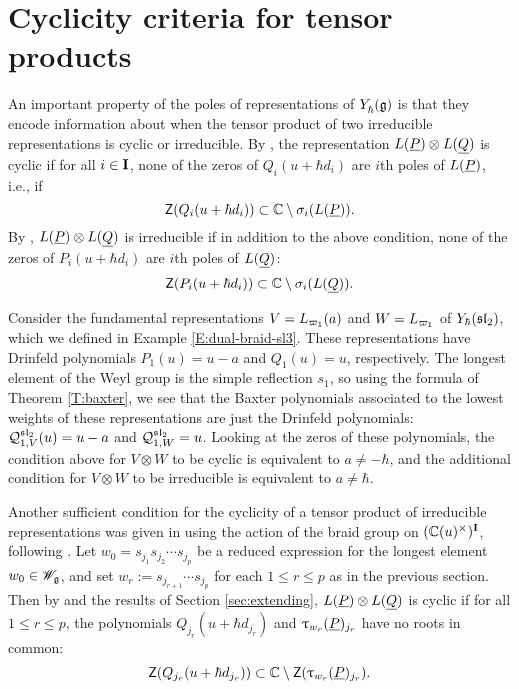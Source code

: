 \section{Cyclicity criteria for tensor products}

An important property of the poles of representations of $Y_\hbar^{}(\mathfrak{g})$ is that they encode information about when the tensor product of two irreducible representations is cyclic or irreducible.
By \cite[Thm. 7.2]{gautam_poles_2023}, the representation $L(\underline{P})\otimes L(\underline{Q})$ is cyclic if for all $i\in\mathbf{I}$, none of the zeros of $Q_i(u+\hbar d_i)$ are $i$th poles of $L(\underline{P})$, i.e., if
\[\mathsf{Z}(Q_i(u+\hbar d_i)) \subset \mathbb{C}\setminus\sigma_i(L(\underline{P})).\]
By \cite[Cor. 7.3]{gautam_poles_2023}, $L(\underline{P})\otimes L(\underline{Q})$ is irreducible if in addition to the above condition, none of the zeros of $P_i(u+\hbar d_i)$ are $i$th poles of $L(\underline{Q})$:
\[\mathsf{Z}(P_i(u+\hbar d_i)) \subset \mathbb{C}\setminus\sigma_i(L(\underline{Q})).\]

\begin{example}\label{E:cyclicity}
    Consider the fundamental representations $V = L_{\varpi_1}(a)$ and $W = L_{\varpi_1}$ of $Y_\hbar(\mathfrak{sl}_2)$, which we defined in Example \ref{E:dual-braid-sl3}.
    These representations have Drinfeld polynomials $P_1(u) = u-a$ and $Q_1(u) = u$, respectively.
    The longest element of the Weyl group is the simple reflection $s_1$, so using the formula of Theorem \ref{T:baxter}, we see that the Baxter polynomials associated to the lowest weights of these representations are just the Drinfeld polynomials: $\mathcal{Q}_{1,V}^{\mathfrak{sl}_2}(u) = u-a$ and $\mathcal{Q}_{1,W}^{\mathfrak{sl}_2} = u$.
    Looking at the zeros of these polynomials, the condition above for $V\otimes W$ to be cyclic is equivalent to $a\neq -\hbar$, and the additional condition for $V\otimes W$ to be irreducible is equivalent to $a\neq\hbar$.
\end{example}

Another sufficient condition for the cyclicity of a tensor product of irreducible representations was given in \cite[Thm. 4.8]{tan_braid_2015} using the action of the braid group on $(\mathbb{C}(u)^\times)^{\mathbf{I}}$, following \cite{chari_braid_2002}.
Let $w_0 = s_{j_1}s_{j_2}\cdots s_{j_p}$ be a reduced expression for the longest element $w_0\in\mathscr{W}_{\mathfrak{g}}$, and set $w_r := s_{j_{r+1}}\cdots s_{j_p}$ for each $1\leq r\leq p$ as in the previous section.
Then by \cite[Thm. 4.8]{tan_braid_2015} and the results of Section \ref{sec:extending}, $L(\underline{P})\otimes L(\underline{Q})$ is cyclic if for all $1\leq r\leq p$, the polynomials $Q_{j_r}(u+\hbar d_{j_r})$ and $\uptau_{w_r}(\underline{P})_{j_r}$ have no roots in common:
\[\mathsf{Z}(Q_{j_r}(u+\hbar d_{j_r})) \subset \mathbb{C}\setminus\mathsf{Z}(\uptau_{w_r}(\underline{P})_{j_r}).\]

